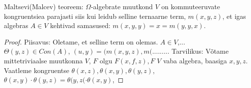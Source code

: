 \documentclass[12pt]{report}
\numberwithin{equation}{section}
\theoremstyle{definition}
\theoremstyle{plain}
\begin{document}
Maltsevi(Malcev) teoreem: $\Omega$-algebrate muutkond $V$ on kommuteeruvate kongruentsiea parajasti siis kui leidub selline ternaarne term, $m(x,y,z)$, et igas algebras $A \in V$ kehtivad samasused: $m(x,y,y) = x = m(y,y,x)$.

\begin{proof}
Piisavus: Oletame, et selline term on olemas. 
$A \in V$,... $\Theta(y,z) \in Con(A)$, $
(u,y) = (m(x,y,z), m( .........$
Tarvilikus: Võtame mittetriviaalse muutkonna $V$, $F$ olgu $F(x,f,z), F$ $V$ vaba algebra, baasiga $x,y,z$. Vaatleme kongruentse $\theta(x,z), \theta(x,y) , \theta(y,z)$, $\theta(x,y) \cdot \theta(y,z) = \theta (y,z( \cdot \theta(x,y)$,  
\end{proof}
\end{document}
